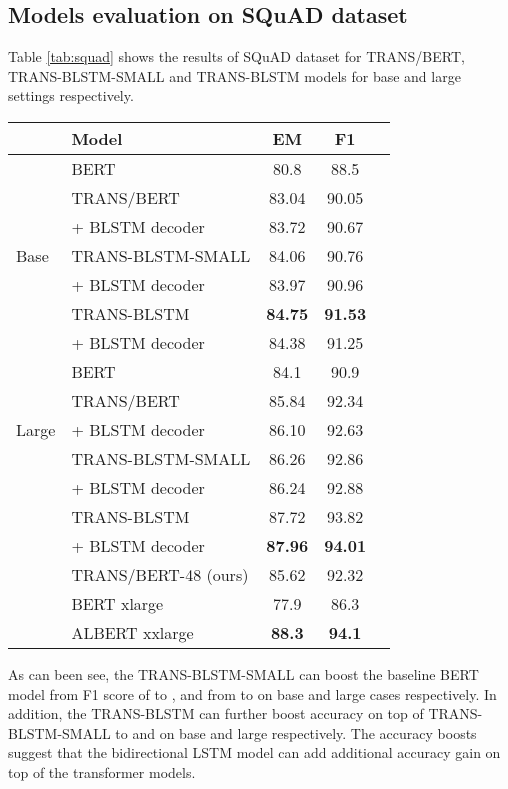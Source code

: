 \documentclass[11pt,a4paper]{article}
\begin{document}
\subsection{Models evaluation on SQuAD dataset} \label{sec:exp_squad}
Table \ref{tab:squad} shows the results of SQuAD dataset for TRANS/BERT, TRANS-BLSTM-SMALL and TRANS-BLSTM models for base and large settings respectively. 
\begin{table*}[!hbpt]
\centering
    \begin{tabular}{llccc}
  & Model & EM & F1 \\ \hline
  & BERT \cite{devlin2018} &  80.8 & 88.5 & \\
   & TRANS/BERT & 83.04 & 90.05\\
   & \hspace{0.1cm} + BLSTM decoder & 83.72 & 90.67 \\ 
   Base & TRANS-BLSTM-SMALL & 84.06 & 90.76\\
   & \hspace{0.1cm} + BLSTM decoder & 83.97& 90.96\\
  & TRANS-BLSTM  & \textbf{84.75} & \textbf{91.53}\\ 
  & \hspace{0.1cm} + BLSTM decoder & 84.38 & 91.25\\
    \hline
    & BERT \cite{devlin2018} &  84.1 & 90.9 & \\
    & TRANS/BERT & 85.84 & 92.34 \\
    Large & \hspace{0.1cm} + BLSTM decoder & 86.10& 92.63\\
   & TRANS-BLSTM-SMALL & 86.26 & 92.86\\ 
   & \hspace{0.1cm} + BLSTM decoder & 86.24 & 92.88  \\
   & TRANS-BLSTM & 87.72 & 93.82 \\ 
   & \hspace{0.1cm} + BLSTM decoder & \textbf{87.96} &  \textbf{94.01} \\ 
   & TRANS/BERT-48 (ours) & 85.62& 92.32 & \\ \hline
      
   & BERT xlarge \cite{lan2019} &  77.9 &  86.3 & \\
   & ALBERT xxlarge \cite{lan2019} & \textbf{88.3} & \textbf{94.1} & \\ \hline
\end{tabular}
    \caption{SQuAD development results for TRANS/BERT, TRANS-BLSTM-SMALL, and TRANS-BLSTM on base and large settings respectively.}
\label{tab:squad}
\end{table*} 
As can been see, the TRANS-BLSTM-SMALL can boost the baseline BERT model from F1 score of  to , and from  to  on base and large cases respectively. In addition, the TRANS-BLSTM can further boost accuracy on top of TRANS-BLSTM-SMALL to  and  on base and large respectively. The accuracy boosts suggest that the bidirectional LSTM model can add additional accuracy gain on top of the transformer models. 
\end{document}
